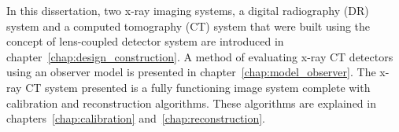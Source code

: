 In this dissertation, two x-ray imaging systems, a digital radiography (DR) system and a computed tomography (CT) system that were built using the concept of lens-coupled detector system are introduced in chapter~\ref{chap:design_construction}.  A method of evaluating x-ray CT detectors using an observer model is presented in chapter~\ref{chap:model_observer}.   The x-ray CT system presented is a fully functioning image system complete with calibration and reconstruction algorithms.  These algorithms are explained in chapters~\ref{chap:calibration} and~\ref{chap:reconstruction}.







































